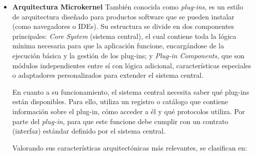 \begin{itemize}
    \begin{itemize}
        \item Costo y simplicidad: es un estilo relativamente económico y fácil de implementar para los casos de uso 
        adecuados.
        \item Facilidad de desarrollo: la separación clara de responsabilidades en filtros independientes facilita 
        mucho el trabajo de codificación.
        \item Escalabilidad: al ser generalmente una arquitectura monolítica, es difícil de escalar de forma elástica.
        \item Tolerancia a fallos: si un filtro o una tubería falla, todo el proceso suele detenerse, lo que lo hace 
        poco resiliente.
    \end{itemize}

    Como conclusión, esta arquitectura es ideal para aplicaciones que requieren un procesamiento de datos secuencial y 
    discreto, como herramientas de procesamiento de texto, compiladores o sistemas de extracción, transformación y 
    carga (ETL) sencillos.

    \item \textbf{Arquitectura Microkernel}
    \newline
    También conocida como \textit{plug-ins}, es un estilo de arquitectura diseñado para productos software que se pueden
    instalar (como navegadores o IDEs). Su estructura se divide en dos componentes principales: \textit{Core System} 
    (sistema central), el cual contiene toda la lógica mínima necesaria para que la aplicación funcione, encargándose de 
    la ejecución básica y la gestión de los plug-ins; y \textit{Plug-in Components}, que son módulos independientes entre sí
    con lógica adicional, características especiales o adaptadores personalizados para extender el sistema central.

    En cuanto a su funcionamiento, el sistema central necesita saber qué plug-ins están disponibles. Para ello, utiliza  
    un registro o catálogo que contiene información sobre el plug-in, cómo acceder a él y qué protocolos utiliza. Por
    parte del \textit{plug-in}, para que este funcione debe cumplir con un contrato (interfaz) estándar definido por 
    el sistema central. 

    Valorando sus características arquitectónicas más relevantes, se clasifican en:


\end{itemize}
